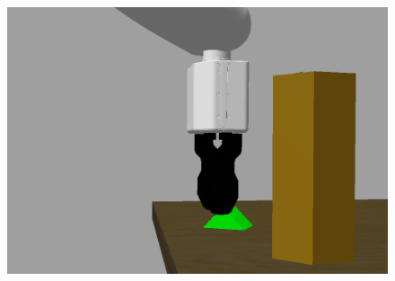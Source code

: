 \begin{enumerate}
\begin{figure}[H]
        \begin{minipage}{0.33\textwidth}
            \centering
            \includegraphics[scale = 0.18]{images/manipulations/pickGreen.png}
        \end{minipage}
    \end{figure}           
    

\end{enumerate}
